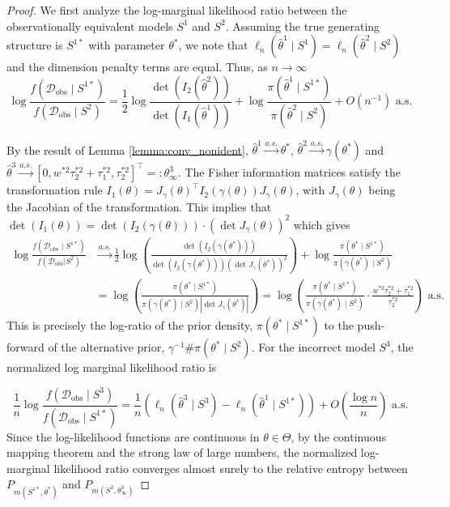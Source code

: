 \documentclass[accepted]{uai2026} %
\newcommand{\train}{\mathcal{D}}
\newcommand{\obsdata}{\train_{\text{obs}}}
\newcommand{\tsone}{\tau_1^{*2}}
\newcommand{\tstwo}{\tau_2^{*2}}
\def\transpose{\intercal}
\theoremstyle{boldremark}
\begin{document}
\begin{proof}
    We first analyze the log-marginal likelihood ratio between the observationally equivalent models $S^1$ and $S^2$. Assuming the true generating structure is $S^{1*}$ with parameter $\theta^*$, we note that $\ell_n(\hat{\theta}^1\mid S^1) = \ell_n(\hat{\theta}^2\mid S^2)$ and the dimension penalty terms are equal. Thus, as $n \to \infty$
    \begin{equation}
        \log \frac{f(\obsdata\mid S^{1*})}{f(\obsdata\mid S^2)} = \frac{1}{2}\log \frac{\det(I_2(\hat{\theta}^2))}{\det(I_1(\hat{\theta}^1))} + \log \frac{\pi(\hat{\theta}^1\mid S^{1*})}{\pi(\hat{\theta}^2\mid S^2)} + O(n^{-1}) \text{ a.s}.
    \end{equation}
    
    By the result of Lemma \ref{lemma:conv_nonident}, $\hat{\theta}^1 \xrightarrow{a.s.} \theta^*$, $\hat{\theta}^2 \xrightarrow{a.s.} \gamma(\theta^*)$ and $\hat{\theta}^3 \xrightarrow{a.s.}   [0, w^{*2}\tstwo+\tsone, \tstwo]^\transpose=:\theta^3_\infty $. The Fisher information matrices satisfy the transformation rule $I_1(\theta) = J_\gamma(\theta)^\top I_2(\gamma(\theta)) J_\gamma(\theta)$,  with $J_\gamma(\theta)$ being the Jacobian of the transformation. This implies that $\det(I_1(\theta)) = \det(I_2(\gamma(\theta))) \cdot (\det J_\gamma(\theta))^2$ which gives
    \begin{align}
        \log \frac{f(\obsdata\mid S^{1*})}{f(\obsdata|S^2)} &\xrightarrow{a.s.} \frac{1}{2}\log \left( \frac{\det(I_2(\gamma(\theta^*)))}{\det(I_2(\gamma(\theta^*))) (\det J_\gamma(\theta^*))^2} \right) + \log \frac{\pi(\theta^*\mid S^{1*})}{\pi(\gamma(\theta^*)\mid S^2)} \\
        &= \log \left( \frac{\pi(\theta^*\mid S^{1*})}{\pi(\gamma(\theta^*)\mid S^2) |\det J_\gamma(\theta^*)|} \right) = \log \left( \frac{\pi(\theta^*\mid S^{1*})}{\pi(\gamma(\theta^*)\mid S^2)} \cdot \frac{w^{*2}\tstwo+\tsone}{\tstwo} \right) \text{ a.s.}
    \end{align}
    This is precisely the log-ratio of the prior density, $\pi(\theta^*\mid S^{1*})$ to the push-forward of the alternative prior, $\gamma^{-1}\#\pi(\theta^* \mid S^2)$. For the incorrect model $S^3$, the normalized log marginal likelihood ratio is 

    $$\frac{1}{n}\log\frac{f(\obsdata\mid S^3)}{f(\obsdata\mid S^{1*})} = \frac{1}{n}\left( \ell_n(\hat{\theta}^3\mid S^3) - \ell_n(\hat{\theta}^{1}\mid S^{1*}) \right) +O \left( \frac{\log n}{n}\right) \text{ a.s.}$$
    Since the log-likelihood functions are continuous in $\theta \in \Theta$, by the continuous mapping theorem and the strong law of large numbers, the normalized log-marginal likelihood ratio converges almost surely to the relative entropy between $P_{m(S^{1*}, \theta^*)}$ and $P_{m(S^3, \theta^3_\infty)}$
    

\end{proof}
\end{document}
